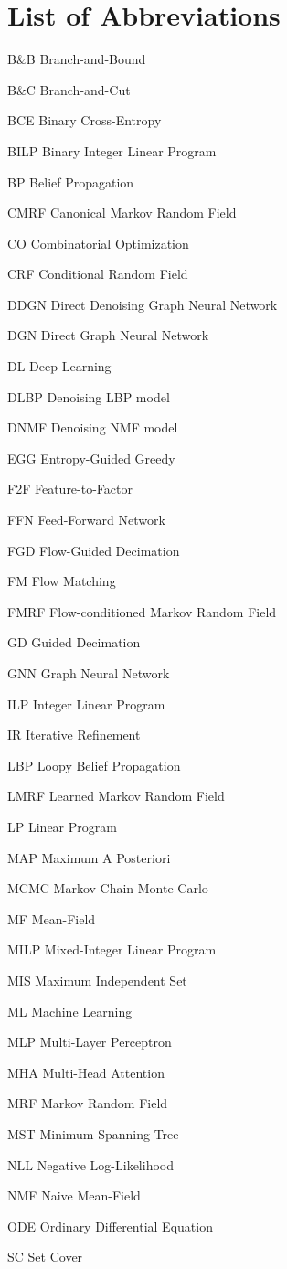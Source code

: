 \chapter*{List of Abbreviations}

\begin{abbreviations}
\item[B\&B] Branch-and-Bound
\item[B\&C] Branch-and-Cut
\item[BCE] Binary Cross-Entropy
\item[BILP] Binary Integer Linear Program
\item[BP] Belief Propagation
\item[CMRF] Canonical Markov Random Field
\item[CO] Combinatorial Optimization
\item[CRF] Conditional Random Field
\item[DDGN] Direct Denoising Graph Neural Network
\item[DGN] Direct Graph Neural Network
\item[DL] Deep Learning
\item[DLBP] Denoising LBP model
\item[DNMF] Denoising NMF model
\item[EGG] Entropy-Guided Greedy
\item[F2F] Feature-to-Factor
\item[FFN] Feed-Forward Network
\item[FGD] Flow-Guided Decimation
\item[FM] Flow Matching
\item[FMRF] Flow-conditioned Markov Random Field
\item[GD] Guided Decimation
\item[GNN] Graph Neural Network
\item[ILP] Integer Linear Program
\item[IR] Iterative Refinement
\item[LBP] Loopy Belief Propagation
\item[LMRF] Learned Markov Random Field
\item[LP] Linear Program
\item[MAP] Maximum A Posteriori
\item[MCMC] Markov Chain Monte Carlo
\item[MF] Mean-Field
\item[MILP] Mixed-Integer Linear Program
\item[MIS] Maximum Independent Set
\item[ML] Machine Learning
\item[MLP] Multi-Layer Perceptron
\item[MHA] Multi-Head Attention
\item[MRF] Markov Random Field
\item[MST] Minimum Spanning Tree
\item[NLL] Negative Log-Likelihood
\item[NMF] Naive Mean-Field
\item[ODE] Ordinary Differential Equation
\item[SC] Set Cover
\end{abbreviations}
